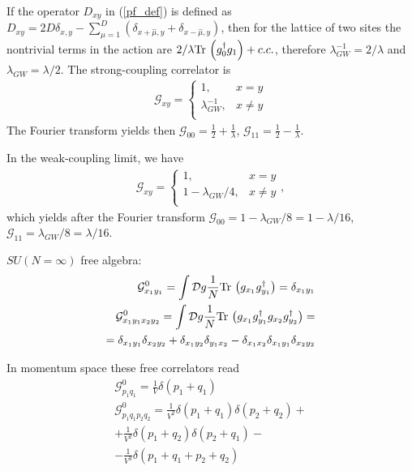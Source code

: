 \documentclass[twocolumn,showpacs,preprintnumbers,superscriptaddress,amsmath,floatfix,amssymb,secnumarabic]{revtex4}
\newcommand{\G}{\mathcal{G}}
\newcommand{\lr}[1]{ \left( #1 \right) }
\newcommand{\tr}{ {\rm Tr} \, }
\begin{document}
 If the operator $D_{x y}$ in (\ref{pf_def}) is defined as $D_{x y} = 2 D \delta_{x,y} - \sum\limits_{\mu=1}^{D} \lr{\delta_{x+\hat{\mu},y} + \delta_{x-\hat{\mu},y}}$, then for the lattice of two sites the nontrivial terms in the action are $2/\lambda \tr\lr{g^{\dag}_0 g_1} + c.c.$, therefore $\lambda_{GW}^{-1} = 2/\lambda$ and $\lambda_{GW} = \lambda/2$. The strong-coupling correlator is
\begin{eqnarray}
\label{gw_sc_correlator}
 \G_{xy} =
 \begin{cases}
                  1, & x = y \\
  \lambda_{GW}^{-1}, & x \neq y \\
 \end{cases}
\end{eqnarray}
The Fourier transform yields then $\G_{00} = \frac{1}{2} + \frac{1}{\lambda}$, $\G_{11} = \frac{1}{2} - \frac{1}{\lambda}$.

In the weak-coupling limit, we have
\begin{eqnarray}
\label{gw_sc_correlator}
 \G_{xy} =
 \begin{cases}
                   1, & x = y \\
  1 - \lambda_{GW}/4, & x \neq y \\
 \end{cases} ,
\end{eqnarray}
which yields after the Fourier transform $\G_{00} = 1 - \lambda_{GW}/8 = 1 - \lambda/16$, $\G_{11} = \lambda_{GW}/8 = \lambda/16$.

$SU\lr{N=\infty}$ free algebra:
\begin{eqnarray}
\label{sun_free_algebra}
 \G^{0}_{x_1 y_1} = \int\mathcal{D}g \frac{1}{N} \tr\lr{g_{x_1} g^{\dag}_{y_1}}
 = \delta_{x_1 y_1}
\nonumber \\
 \G^{0}_{x_1 y_1 x_2 y_2} = \int\mathcal{D}g \frac{1}{N} \tr\lr{g_{x_1} g^{\dag}_{y_1} g_{x_2} g^{\dag}_{y_2}}
 = \nonumber \\ =
 \delta_{x_1 y_1} \delta_{x_2 y_2} + \delta_{x_1 y_2} \delta_{y_1 x_2} - \delta_{x_1 x_2} \delta_{x_1 y_1} \delta_{x_2 y_2}
\end{eqnarray}

In momentum space these free correlators read
\begin{eqnarray}
\label{sun_free_algebra_mspace}
 \G^{0}_{p_1 q_1} = \frac{1}{V} \delta\lr{p_1 + q_1}
\nonumber \\
 \G^{0}_{p_1 q_1 p_2 q_2} =
 \frac{1}{V^2} \delta\lr{p_1 + q_1} \delta\lr{p_2 + q_2}
 + \nonumber \\ +
 \frac{1}{V^2} \delta\lr{p_1 + q_2} \delta\lr{p_2 + q_1}
 - \nonumber \\ -
 \frac{1}{V^3} \delta\lr{p_1 + q_1 + p_2 + q_2}
\end{eqnarray}
\end{document}

